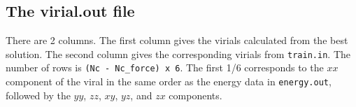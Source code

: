 \documentclass[12pt,a4paper]{report}
\begin{document}
\subsection{The virial.out file}

There are 2 columns. The first column gives the virials calculated from the best solution. The second column gives the corresponding virials from \verb"train.in". The number of rows is \verb"(Nc - Nc_force) x 6". The first 1/6 corresponds to the $xx$ component of the viral in the same order as the energy data in \verb"energy.out", followed by the $yy$, $zz$, $xy$, $yz$, and $zx$ components.




\end{document}

